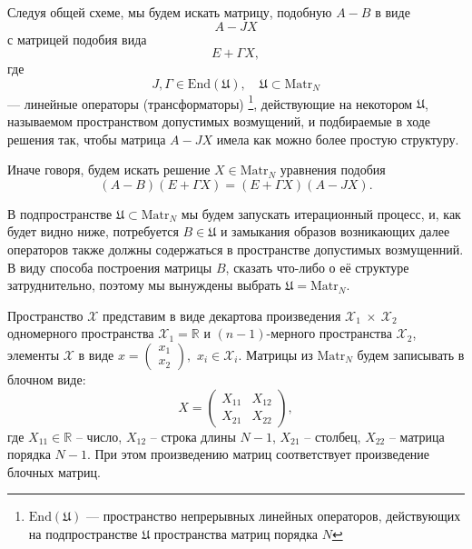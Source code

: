 Следуя общей схеме, мы будем искать матрицу, подобную \( A - B \)
в виде
\[ A - J X \]
с матрицей подобия вида
\[ E + \Gamma X ,\]
где
\[ J, \Gamma \in \mathrm{End}\left(\mathfrak U\right),\quad \mathfrak{U}\subset\mathrm{Matr}_{N} \]
--- линейные операторы (трансформаторы)
\footnote{\( \mathrm{End}\left(\mathfrak U\right) \) --- пространство непрерывных линейных операторов,
действующих на подпространстве \( \mathfrak U \) пространства матриц порядка \( N \)},
действующие на некотором \( \mathfrak U \),
называемом пространством допустимых возмущений,
и подбираемые в ходе решения так, чтобы матрица \( A - JX \)
имела как можно более простую структуру.

Иначе говоря, будем искать решение \( X \in\mathrm{Matr}_{N} \)
уравнения подобия
\begin{equation}\label{eq:similarity-orig}
    (A - B)(E+\Gamma X) = (E+\Gamma X) (A - JX).
\end{equation}

В подпространстве \( \mathfrak U \subset \mathrm{Matr}_{N} \)
мы будем запускать итерационный процесс,
и, как будет видно ниже, потребуется \( B \in \mathfrak U \)
и замыкания образов возникающих далее операторов также
должны содержаться в
пространстве допустимых возмущенний.
В виду способа построения матрицы \( B \), сказать что-либо о её структуре затруднительно,
поэтому мы вынуждены выбрать \( \mathfrak U = \mathrm{Matr}_{N}\).

Пространство \( \mathscr{X} \) представим в виде
декартова произведения
\( \mathscr{X}_1~\times~\mathscr{X}_2 \)
одномерного пространства \( \mathscr{X}_1=\mathbb{R} \)
и \((n-1)\)-мерного пространства \( \mathscr{X}_2 \),
элементы \( \mathscr{X} \) в виде
\( x=\begin{pmatrix}x_1\\x_2\end{pmatrix}, \)
\( x_i\in\mathscr{X}_i \).
Матрицы из \( \mathrm{Matr}_{N} \) будем записывать
в блочном виде:
\[
    X = \begin{pmatrix}
    X_{11} & X_{12} \\
    X_{21} & X_{22}
    \end{pmatrix},
    \]
где \( { X_{11}\in\mathbb{R} } \) -- число,
    \( X_{12} \) -- строка длины \( N-1 \),
    \( X_{21} \) -- столбец,
    \( X_{22} \) -- матрица порядка \( N-1 \).
При этом произведению матриц соответствует произведение блочных матриц.

